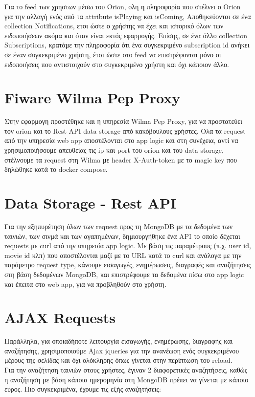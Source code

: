 \documentclass{article}
\begin{document}
    \pagebreak
    \noindent
    Για το feed των χρηστων μέσω του Orion, ολη η πληροφορία που στέλνει ο Orion για την αλλαγή ενός από τα attribute isPlaying και isComing, Αποθηκεύονται σε ένα collection Notifications, ετσι ώστε ο χρήστης να έχει και ιστορικό όλων των ειδοποιήσεων ακόμα και όταν είναι εκτός εφαρμογής. Επίσης, σε ένα άλλο collection Subscriptions, κρατάμε την πληροφορία ότι ένα συγκεκριμένο subscription id ανήκει σε έναν συγκεκριμένο χρήστη, έτσι ώστε στο feed να επιστρέφονται μόνο οι ειδοποιήσεις που αντιστοιχούν στο συγκεκριμένο χρήστη και όχι κάποιον άλλο.
\section*{Fiware Wilma Pep Proxy}	
    Στην εφαρμογη προστέθηκε και η υπηρεσία Wilma Pep Proxy, για να προστατεύει τον orion και το Rest API data storage από κακόβουλους χρήστες. Όλα τα request από την υπηρεσία web app αποστέλονται στο app logic και στη συνέχεια, αντί να χρησιμοποιήσουμε απευθείας τις ip και port του orion και του data storage, στέλνουμε τα request στη Wilma με header X-Auth-token με το magic key που δηλώθηκε κατά το docker compose.
    
\section*{Data Storage - Rest API}	
    Για την εξηπυρέτηση όλων των request προς τη MongoDB με τα δεδομένα των ταινιών, των σινμά και των αγαπημένων, δημιουργήθηκε ένα API το οποίο δέχεται requests με curl από την υπηρεσία app logic. Με βάση τις παραμέτρους (π.χ. user id, movie id κλπ) που αποστέλονται μαζί με το URL κατά το curl και ανάλογα με την παράμετρο request type, κάνουμε εισαγωγές, ενημέρωσεις, διαγραφές και αναζήτησεις στη βάση δεδομένων MongoDB, και επιστρέφουμε τα δεδομένα πίσω στο app logic και έπειτα στο web app, για να προβληθούν στο χρήστη.
    
\section*{ΑJAX Requests}
    Παράλληλα, για οποιαδήποτε λειτουργία εισαγωγής, ενημέρωσης, διαγραφής και αναζήτησης, χρησιμοποιούμε Ajax jqueries για την ανανέωση ενός συγκεκριμένου μέρους της σελίδας και όχι ολόκληρης όπως γίνεται στην περίπτωση του reload. \\
    
    \noindent
    Για την αναζήτηση ταινιών στους χρήστες, έγιναν 2 διαφορετικές αναζητήσεις, καθώς η αναζήτηση με βάση κάποια ημερομηνία στη MongoDB πρέπει να γίνεται με κάποιο εύρος.
    Πιο συγκεκριμένα, έχουμε τις εξής αναζητήσεις:
    
\end{document}

